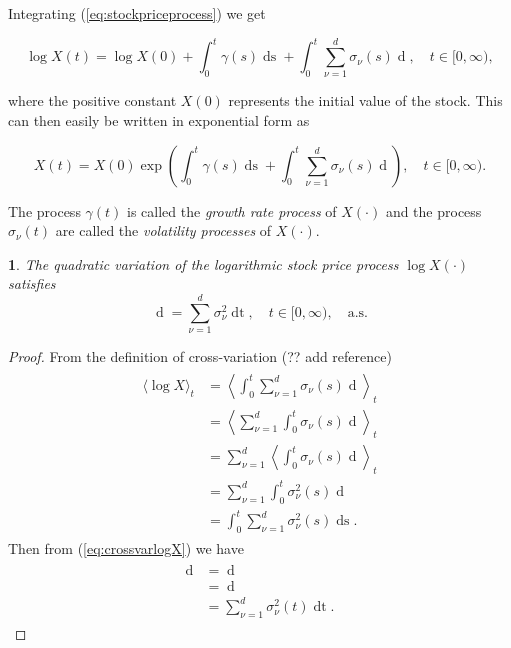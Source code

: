 \documentclass[british]{amsart}
\numberwithin{equation}{section}
\numberwithin{figure}{section}
\theoremstyle{plain}
\theoremstyle{definition}
\theoremstyle{plain}
\theoremstyle{plain}
\theoremstyle{plain}
\newtheorem{prop}[thm]{\protect\propositionname}
\theoremstyle{remark}
\theoremstyle{plain}
\providecommand{\propositionname}{Proposition}
\renewcommand{\d}[1]{\mathop{\mathrm{d}{#1}}}
\newcommand{\ranget}{t\in[0,\infty)}
\newcommand{\almostsurely}{\text{a.s.}}
\begin{document}
Integrating (\ref{eq:stockpriceprocess}) we get

\begin{equation}
	\log X(t) = \log X(0) + \int_{0}^{t} \gamma(s)\d{s} + 
	\int_{0}^{t} \sum_{\nu=1}^{d} \sigma_{\nu}(s){\d{W_{\nu}(s)}}, \quad 
	\ranget,
\end{equation}

where the positive constant $X(0)$ represents the initial value of the stock. 
This can then easily be written in exponential form as

\begin{equation}
	X(t) = X(0) \exp{ \left(
			\int_{0}^{t} \gamma(s)\d{s} + \int_{0}^{t} 
			\sum_{\nu=1}^{d} \sigma_{\nu}(s){\d{W_{\nu}(s)}} 
			\right)
		}, \quad \ranget.
\end{equation}

The process $\gamma(t)$ is called the \textit{growth rate process} of $X(\cdot)$ 
and the process $\sigma_{\nu}(t)$ are called the \textit{volatility processes} of 
$X(\cdot)$.

\begin{prop} 
	\label{prop:crossvarlogX}
	\cite{fernholz2002} The quadratic variation of 
	the logarithmic stock price process $\log{X(\cdot)}$ satisfies
	\begin{equation}
		\d{\langle \log{X} \rangle_{t}} = \sum_{\nu=1}^{d} \sigma_{\nu}^2\d{t},
		\quad \ranget,
		\quad \almostsurely
	\end{equation}
\end{prop}

\begin{proof}
	From the definition of cross-variation (?? add reference)
	\begin{gather}
		\begin{split} 
			\label{eq:crossvarlogX}
			\langle \log{X} \rangle_{t} 
			 & = \left< \int_{0}^{t} \sum_{\nu=1}^{d} \sigma_{\nu}(s) \d{W_{\nu}(s)} \right>_{t} \\
			 & = \left< \sum_{\nu=1}^{d} \int_{0}^{t} \sigma_{\nu}(s) \d{W_{\nu}(s)} \right>_{t} \\
			 & = \sum_{\nu=1}^{d} \left< \int_{0}^{t} \sigma_{\nu}(s) \d{W_{\nu}(s)} \right>_{t} \\
			 & = \sum_{\nu=1}^{d} \int_{0}^{t} \sigma_{\nu}^{2}(s) \d{\langle W_{\nu}(s) \rangle } \\
			 & = \int_{0}^{t} \sum_{\nu=1}^{d} \sigma_{\nu}^{2}(s) \d{s}.
		\end{split}
	\end{gather}
	Then from (\ref{eq:crossvarlogX}) we have
	\begin{gather}
		\begin{split}
			\d{\langle \log{X} \rangle_{t}}
				& = \d{\left<\int_{0}^{t} \sum_{\nu=1}^{d} \sigma_{\nu}(s) \d{W_{\nu}(s)}\right>_{t}}\\
				& = \d{\left(\int_{0}^{t} \sum_{\nu=1}^{d} \sigma_{\nu}^{2}(s) \d{s}\right)} \\
				& = \sum_{\nu=1}^{d} \sigma_{\nu}^{2}(t) \d{t}.
		\end{split}
	\end{gather}
\end{proof}
\end{document}
